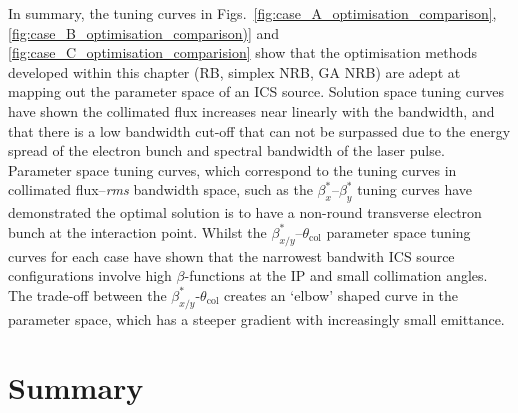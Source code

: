 \documentclass[../main.tex]{subfiles}
\begin{document}
In summary, the tuning curves in Figs.~\ref{fig:case_A_optimisation_comparison}, \ref{fig:case_B_optimisation_comparison)} and \ref{fig:case_C_optimisation_comparision} show that the optimisation methods developed within this chapter (RB, simplex NRB, GA NRB) are adept at mapping out the parameter space of an ICS source. Solution space tuning curves have shown the collimated flux increases near linearly with the  bandwidth, and that there is a low bandwidth cut-off that can not be surpassed due to the energy spread of the electron bunch and spectral bandwidth of the laser pulse. Parameter space tuning curves, which correspond to the tuning curves in collimated flux--\textit{rms} bandwidth space, such as the $\beta_{x}^{*}$--$\beta_{y}^{*}$ tuning curves have demonstrated the optimal solution is to have a non-round transverse electron bunch at the interaction point. Whilst the $\beta_{x/y}^{*}$--$\theta_{\mathrm{col}}$ parameter space tuning curves for each case have shown that the narrowest bandwith ICS source configurations involve high $\beta$-functions at the IP and small collimation angles. The trade-off between the $\beta_{x/y}^{*}$-$\theta_{\mathrm{col}}$ creates an `elbow' shaped curve in the parameter space, which has a steeper gradient with increasingly small emittance.      

\section{Summary}
\end{document}
